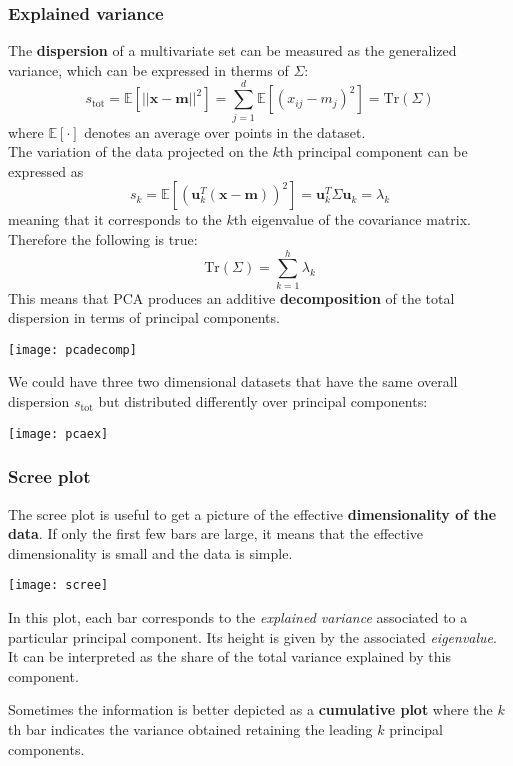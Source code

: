 \subsubsection{Explained variance}
The \textbf{dispersion} of a multivariate set can be measured as the generalized variance, which can be expressed in therms of $\Sigma$:
\begin{equation}
	s_{\text{tot}}=\mathbb{E}[\lvert\lvert \mathbf{x} - \mathbf{m}\rvert\rvert^2] = \sum_{j=1}^{d} \mathbb{E}[(x_{ij}-m_j)^2] = \text{Tr}(\Sigma)
\end{equation}
where $\mathbb{E}[\cdot]$ denotes an average over points in the dataset.\\
The variation of the data projected on the $k$th principal component can be expressed as
\begin{equation}
	s_k = \mathbb{E}[(\mathbf{u}_k^T(\mathbf{x}-\mathbf{m}))^2] = \mathbf{u}_k^T\Sigma\mathbf{u}_k=\lambda_k
\end{equation}
meaning that it corresponds to the $k$th eigenvalue of the covariance matrix. Therefore the following is true:
\begin{equation}
	\text{Tr}(\Sigma) = \sum_{k=1}^{h}\lambda_k
\end{equation}
This means that PCA produces an additive \textbf{decomposition} of the total dispersion in terms of principal components.
\begin{center}
	\texttt{[image: pcadecomp]}
\end{center}

\begin{example}
	We could have three two dimensional datasets that have the same overall dispersion $s_\text{tot}$ but distributed differently over principal components:
	\begin{center}
		\texttt{[image: pcaex]}
	\end{center}
\end{example}

\subsubsection{Scree plot}
The scree plot is useful to get a picture of the effective \textbf{dimensionality of the data}. If only the first few bars are large, it means that the effective dimensionality is small and the data is simple.
\begin{center}
	\texttt{[image: scree]}
\end{center}
In this plot, each bar corresponds to the \textit{explained variance} associated to a particular principal component. Its height is given by the associated \textit{eigenvalue}. It can be interpreted as the share of the total variance explained by this component.
\begin{note}
	Sometimes the information is better depicted as a \textbf{cumulative plot} where the $k$th bar indicates the variance obtained retaining the leading $k$ principal components.
\end{note}

